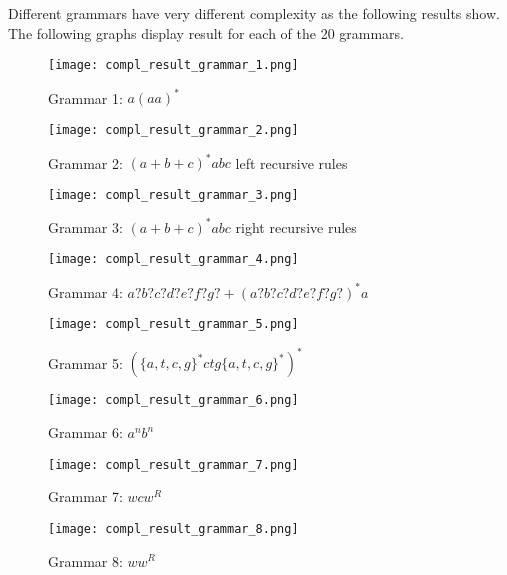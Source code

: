 Different grammars have very different complexity as the following results show. The following graphs display result for each of the 20 grammars.


\begin{figure}[h]
  \texttt{[image: compl\_result\_grammar\_1.png]}
  \caption{Grammar 1: $a(aa)^*$}
  \label{compl_result_grammar_1}
\end{figure}

\begin{figure}[h]
  \texttt{[image: compl\_result\_grammar\_2.png]}
  \caption{Grammar 2: $(a+b+c)^*abc$ left recursive rules}
  \label{compl_result_grammar_2}
\end{figure}

\begin{figure}[h]
  \texttt{[image: compl\_result\_grammar\_3.png]}
  \caption{Grammar 3: $(a+b+c)^*abc$ right recursive rules}
  \label{compl_result_grammar_3}
\end{figure}

\begin{figure}[h]
  \texttt{[image: compl\_result\_grammar\_4.png]}
  \caption{Grammar 4: $a?b?c?d?e?f?g? + (a?b?c?d?e?f?g?)^*a$}
  \label{compl_result_grammar_4}
\end{figure}

\begin{figure}[h]
  \texttt{[image: compl\_result\_grammar\_5.png]}
  \caption{Grammar 5: $(\{a,t,c,g\}^*ctg\{a,t,c,g\}^*)^*$}
  \label{compl_result_grammar_5}
\end{figure}

\begin{figure}[h]
  \texttt{[image: compl\_result\_grammar\_6.png]}
  \caption{Grammar 6: $a^n b^n$}
  \label{compl_result_grammar_6}
\end{figure}

\begin{figure}[h]
  \texttt{[image: compl\_result\_grammar\_7.png]}
  \caption{Grammar 7: $wcw^R$}
  \label{compl_result_grammar_7}
\end{figure}

\begin{figure}[h]
  \texttt{[image: compl\_result\_grammar\_8.png]}
  \caption{Grammar 8: $ww^R$}
  \label{compl_result_grammar_8}
\end{figure}

